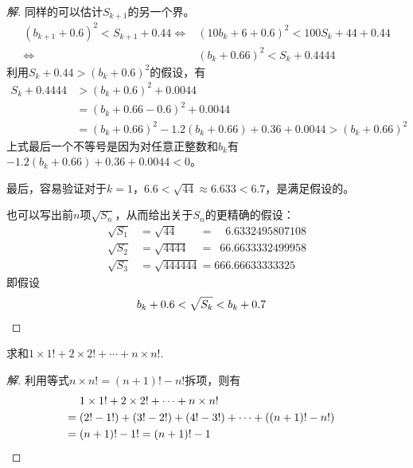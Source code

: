 \begin{proof}[解]
  同样的可以估计$S_{k+1}$的另一个界。
  \begin{align*}
    (b_{k+1}+0.6)^2 < S_{k+1} + 0.44 \iff & (10b_k + 6 + 0.6)^2 < 100S_k + 44 + 0.44\\
    \iff & (b_k + 0.66)^2 < S_k + 0.4444
  \end{align*}
  利用$S_k + 0.44 > (b_k + 0.6)^2$的假设，有
  \begin{align*}
    S_k+ 0.4444 & > (b_k + 0.6)^2 + 0.0044\\
                & = (b_k + 0.66 -0.6)^2 + 0.0044\\
                & = (b_k + 0.66)^2 -1.2(b_k+0.66) + 0.36 + 0.0044 > (b_k + 0.66)^2
  \end{align*}
  上式最后一个不等号是因为对任意正整数和$b_k$有$-1.2(b_k+0.66)+0.36+0.0044<0$。

  最后，容易验证对于$k=1$，$6.6<\sqrt{44}\approx 6.633<6.7$，是满足假设的。
  
  也可以写出前$n$项$\sqrt{S_n}$，从而给出关于$S_n$的更精确的假设：
  \begin{align*}
    \sqrt{S_1} &= \sqrt{44}\phantom{4444} = \phantom{66}6.6332495807108\\
    \sqrt{S_2} &= \sqrt{4444}\phantom{44} = \phantom{6}66.6633332499958\\
    \sqrt{S_3} &= \sqrt{444444} = 666.66633333325
  \end{align*}
  即假设
  \begin{align*}
    b_k + 0.6 < \sqrt{S_k} < b_k + 0.7 &\qedhere
  \end{align*}  
\end{proof}

\begin{example}
  求和$1\times 1!+2\times 2! + \cdots + n\times n!.$
\end{example}
\begin{proof}[解]
  利用等式$n\times n! = (n+1)! - n!$拆项，则有
  \begin{align*}
    &1\times 1!+2\times 2! + \cdots + n\times n!\\
    ={}&(2! - 1!) + (3! - 2!) + (4! - 3!) + \cdots + \left( (n+1)! - n! \right)\\ %
    ={}& (n+1)! - 1! = (n+1)! - 1 &\qedhere
  \end{align*}
\end{proof}
